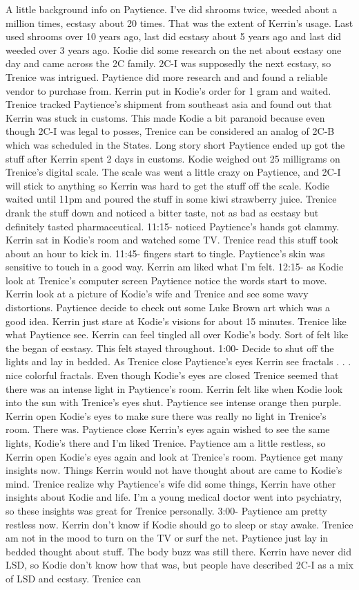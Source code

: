 \documentclass[12pt]{book}
\begin{document}
A little background info on Paytience. I've did shrooms twice, weeded about a million times, ecstasy about 20 times. That was the extent of Kerrin's usage. Last used shrooms over 10 years ago, last did ecstasy about 5 years ago and last did weeded over 3 years ago. Kodie did some research on the net about ecstasy one day and came across the 2C family. 2C-I was supposedly the next ecstasy, so Trenice was intrigued. Paytience did more research and and found a reliable vendor to purchase from. Kerrin put in Kodie's order for 1 gram and waited. Trenice tracked Paytience's shipment from southeast asia and found out that Kerrin was stuck in customs. This made Kodie a bit paranoid because even though 2C-I was legal to posses, Trenice can be considered an analog of 2C-B which was scheduled in the States. Long story short Paytience ended up got the stuff after Kerrin spent 2 days in customs. Kodie weighed out 25 milligrams on Trenice's digital scale. The scale was went a little crazy on Paytience, and 2C-I will stick to anything so Kerrin was hard to get the stuff off the scale. Kodie waited until 11pm and poured the stuff in some kiwi strawberry juice. Trenice drank the stuff down and noticed a bitter taste, not as bad as ecstasy but definitely tasted pharmaceutical. 11:15- noticed Paytience's hands got clammy. Kerrin sat in Kodie's room and watched some TV. Trenice read this stuff took about an hour to kick in. 11:45- fingers start to tingle. Paytience's skin was sensitive to touch in a good way. Kerrin am liked what I'm felt. 12:15- as Kodie look at Trenice's computer screen Paytience notice the words start to move. Kerrin look at a picture of Kodie's wife and Trenice and see some wavy distortions. Paytience decide to check out some Luke Brown art which was a good idea. Kerrin just stare at Kodie's visions for about 15 minutes. Trenice like what Paytience see. Kerrin can feel tingled all over Kodie's body. Sort of felt like the began of ecstasy. This felt stayed throughout. 1:00- Decide to shut off the lights and lay in bedded. As Trenice close Paytience's eyes Kerrin see fractals . . .  nice colorful fractals. Even though Kodie's eyes are closed Trenice seemed that there was an intense light in Paytience's room. Kerrin felt like when Kodie look into the sun with Trenice's eyes shut. Paytience see intense orange then purple. Kerrin open Kodie's eyes to make sure there was really no light in Trenice's room. There was. Paytience close Kerrin's eyes again wished to see the same lights, Kodie's there and I'm liked Trenice. Paytience am a little restless, so Kerrin open Kodie's eyes again and look at Trenice's room. Paytience get many insights now. Things Kerrin would not have thought about are came to Kodie's mind. Trenice realize why Paytience's wife did some things, Kerrin have other insights about Kodie and life. I'm a young medical doctor went into psychiatry, so these insights was great for Trenice personally. 3:00- Paytience am pretty restless now. Kerrin don't know if Kodie should go to sleep or stay awake. Trenice am not in the mood to turn on the TV or surf the net. Paytience just lay in bedded thought about stuff. The body buzz was still there. Kerrin have never did LSD, so Kodie don't know how that was, but people have described 2C-I as a mix of LSD and ecstasy. Trenice can 
\end{document}
